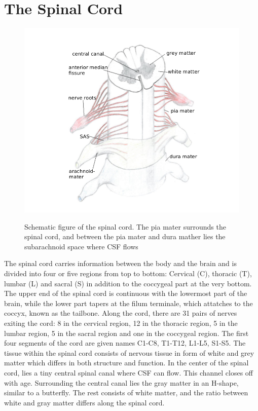 \section{The Spinal Cord}
\begin{center}
\begin{figure}[!ht]
\includegraphics[scale=0.3]{figures/Spinal_Cord} \\
\caption{Schematic figure of the spinal cord. The pia mater surrounds the spinal cord, and between the pia mater and dura mather lies the subarachnoid space where CSF flows} \label{fig:Cord}
\end{figure}
\end{center}
The spinal cord carries information between the body and the brain and is divided into four or five regions from top to bottom: Cervical (C), thoracic (T), lumbar (L) and sacral (S) in addition to the coccygeal part at the very bottom. The upper end of the spinal cord is continuous with the lowermost part of the brain, while the lower part tapers at the filum terminale, which attatches to the coccyx, known as the tailbone. Along the cord, there are 31 pairs of nerves exiting the cord: 8 in the cervical region, 12 in the thoracic region, 5 in the lumbar region, 5 in the sacral region and one in the coccygeal region. The first four segments of the cord are given names C1-C8, T1-T12, L1-L5, S1-S5. The tissue within the spinal cord consists of nervous tissue in form of white and grey matter which differs in both structure and function. In the center of the spinal cord, lies a tiny central spinal canal where CSF can flow. This channel closes off with age. Surrounding the central canal lies the gray matter in an H-shape, similar to a butterfly. The rest consists of white matter, and the ratio between white and gray matter differs along the spinal cord. 
